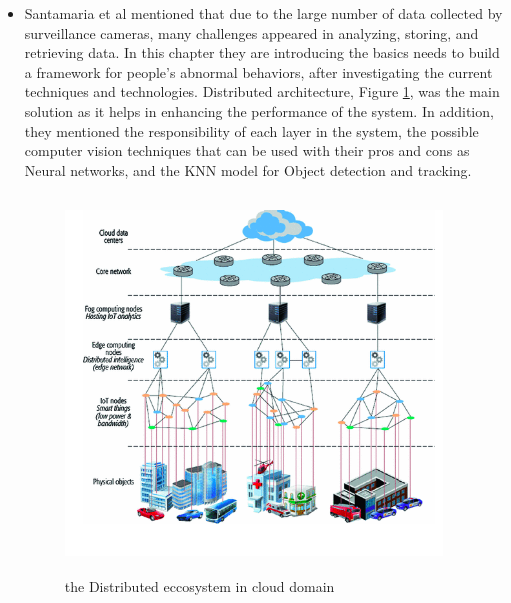 \documentclass[12pt]{article}
\begin{document}
\begin{itemize}
\item Santamaria et al \cite{Santamaria2019} mentioned that due to the large number of data collected by surveillance cameras, many challenges appeared in analyzing, storing, and retrieving data. In this chapter they are introducing the basics needs to build a framework for people's abnormal behaviors, after investigating the current techniques and technologies. Distributed architecture, Figure \ref{Santamaria}, was the main solution as it helps in enhancing the performance of the system. In addition, they mentioned the responsibility of each layer in the system, the possible computer vision techniques that can be used with their pros and cons as Neural networks, and the KNN model for Object detection and tracking.

\begin{figure}[!ht]
\centering
 \begin{minipage}{.5\textwidth}
  \includegraphics[width=10.0cm, height=10.0cm]{./4.png}
  \caption{the Distributed eccosystem in cloud domain}
  \label{Santamaria}
 \end{minipage}
\end{figure}


\end{itemize}
\end{document}
